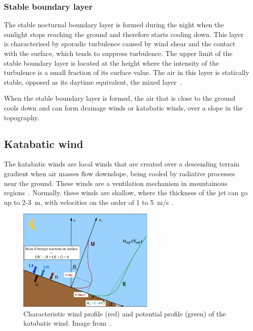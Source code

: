 \subsubsection{Stable boundary layer}
The stable nocturnal boundary layer is formed during the night when the sunlight stops reaching the ground and therefore starts cooling down. This layer is characterised by sporadic turbulence caused by wind shear and the contact with the surface, which tends to suppress turbulence. The upper limit of the stable boundary layer is located at the height where the intensity of the turbulence is a small fraction of its surface value. The air in this layer is statically stable, opposed as its daytime equivalent, the mixed layer~\citep{stull2012introduction}.

When the stable boundary layer is formed, the air that is close to the ground cools down and can form drainage winds or katabatic winds, over a slope in the topography.

\subsection{Katabatic wind} \label{sec:katabatic_winds}

The katabatic winds are local winds that are created over a descending terrain gradient when air masses flow downslope, being cooled by radiative processes near the ground. These winds are a ventilation mechanism in mountainous regions~\citep{manins1979model}. Normally, these winds are shallow, where the thickness of the jet can go up to 2-3~m, with velocities on the order of 1 to 5~m/s \citep{stull2012introduction}. 

\begin{figure}[ht!]
	\vspace{-5pt}
    \centering
\includegraphics[width=0.6\textwidth]{fig/chapter_2/profiles_katabatic_wind.png}
    \caption{Characteristic wind profile (red) and potential profile (green) of the katabatic wind. Image from~\cite{claudine}.}
    \label{fig:u_profile}
  \vspace{-5pt}
\end{figure}

